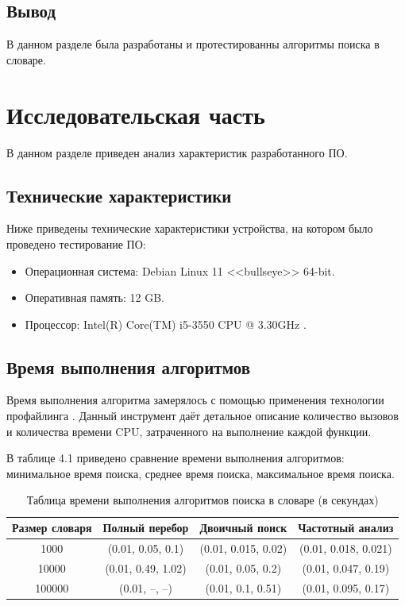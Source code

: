 \documentclass[12pt]{report}
\begin{document}
\section*{Вывод}
	
В данном разделе была разработаны и протестированны алгоритмы поиска в словаре.
	
\chapter{Исследовательская часть}
	
В данном разделе приведен анализ характеристик разработанного ПО.

\section{Технические характеристики}
	
Ниже приведены технические характеристики устройства, на котором было проведено тестирование ПО:
	
\begin{itemize}
	\item Операционная система: Debian \cite{debian} Linux \cite{linux} 11 <<bullseye>> 64-bit.
	\item Оперативная память: 12 GB.
	\item Процессор: Intel(R) Core(TM) i5-3550 CPU @ 3.30GHz \cite{i5}.	
\end{itemize}
	
\section{Время выполнения алгоритмов}
	
Время выполнения алгоритма замерялось с помощью применения технологии профайлинга \cite{profiling}. Данный инструмент даёт детальное описание количество вызовов и количества времени CPU, затраченного на выполнение каждой функции.

В таблице 4.1 приведено сравнение времени выполнения алгоритмов: минимальное время поиска, среднее время поиска, максимальное время поиска.

\begin{table} [H]
		\caption{Таблица времени выполнения алгоритмов поиска в словаре (в секундах)}
		\begin{center}
			\begin{tabular}{|c c c c |} 
				\hline
				Размер словаря & Полный перебор & Двоичный поиск & Частотный анализ  \\  
				\hline
				1000 & (0.01, 0.05, 0.1) & (0.01, 0.015, 0.02) & (0.01, 0.018, 0.021)  \\
				\hline
				10000 & (0.01, 0.49, 1.02) & (0.01, 0.05, 0.2) & (0.01, 0.047, 0.19) \\
				\hline
				100000 & (0.01, --, --) & (0.01, 0.1, 0.51) & (0.01, 0.095, 0.17) \\
				\hline
			\end{tabular}
		\end{center}
\end{table}
	
\end{document}
